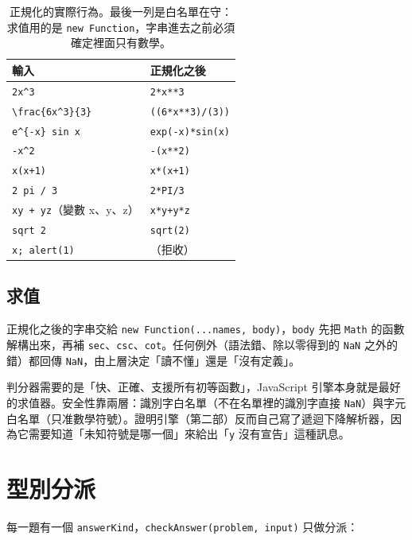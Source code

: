 \documentclass[11pt,a4paper,oneside]{book}
\renewcommand{\_}{\ifmmode\origunderscore\else\textunderscore\allowbreak\fi}
\newcommand{\code}[1]{\texttt{#1}}
\begin{document}
\begin{table}[h]
\centering\small\sffamily
\begin{tabularx}{\textwidth}{@{}lY@{}}
\toprule
輸入 & 正規化之後 \\
\midrule
\code{2x\string^3} & \code{2*x**3} \\
\code{\textbackslash frac\{6x\string^3\}\{3\}} & \code{((6*x**3)/(3))} \\
\code{e\string^\{-x\} sin x} & \code{exp(-x)*sin(x)} \\
\code{-x\string^2} & \code{-(x**2)} \\
\code{x(x+1)} & \code{x*(x+1)} \\
\code{2 pi / 3} & \code{2*PI/3} \\
\code{xy + yz}（變數 x、y、z） & \code{x*y+y*z} \\
\code{sqrt 2} & \code{sqrt(2)} \\
\code{x; alert(1)} & （拒收） \\
\bottomrule
\end{tabularx}
\caption{正規化的實際行為。最後一列是白名單在守：求值用的是 \code{new Function}，字串進去之前必須確定裡面只有數學。}
\end{table}

\section{求值}
正規化之後的字串交給 \code{new Function(...names, body)}，\code{body} 先把 \code{Math} 的函數解構出來，再補 \code{sec}、\code{csc}、\code{cot}。任何例外（語法錯、除以零得到的 \code{NaN} 之外的錯）都回傳 \code{NaN}，由上層決定「讀不懂」還是「沒有定義」。

\begin{decision}
判分器需要的是「快、正確、支援所有初等函數」，JavaScript 引擎本身就是最好的求值器。安全性靠兩層：識別字白名單（不在名單裡的識別字直接 \code{NaN}）與字元白名單（只准數學符號）。證明引擎（第二部）反而自己寫了遞迴下降解析器，因為它需要知道「未知符號是哪一個」來給出「\code{y} 沒有宣告」這種訊息。
\end{decision}

\chapter{型別分派}
每一題有一個 \code{answerKind}，\code{checkAnswer(problem, input)} 只做分派：
\end{document}
